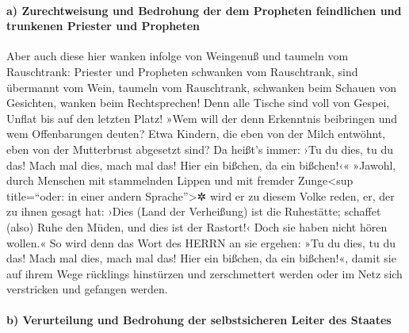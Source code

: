 \hypertarget{a-zurechtweisung-und-bedrohung-der-dem-propheten-feindlichen-und-trunkenen-priester-und-propheten}{%
\paragraph{a) Zurechtweisung und Bedrohung der dem Propheten feindlichen
und trunkenen Priester und
Propheten}\label{a-zurechtweisung-und-bedrohung-der-dem-propheten-feindlichen-und-trunkenen-priester-und-propheten}}

Aber auch diese hier wanken infolge von Weingenuß und
taumeln vom Rauschtrank: Priester und Propheten schwanken vom
Rauschtrank, sind übermannt vom Wein, taumeln vom Rauschtrank, schwanken
beim Schauen von Gesichten, wanken beim Rechtsprechen!
Denn alle Tische sind voll von Gespei, Unflat bis auf den
letzten Platz! »Wem will der denn Erkenntnis beibringen
und wem Offenbarungen deuten? Etwa Kindern, die eben von der Milch
entwöhnt, eben von der Mutterbrust abgesetzt sind? Da
heißt's immer: ›Tu du dies, tu du das! Mach mal dies, mach mal das! Hier
ein bißchen, da ein bißchen!‹« »Jawohl, durch Menschen
mit stammelnden Lippen und mit fremder Zunge\textless sup title=``oder:
in einer andern Sprache''\textgreater✲ wird er zu diesem Volke reden,
er, der zu ihnen gesagt hat: ›Dies (Land der Verheißung)
ist die Ruhestätte; schaffet (also) Ruhe den Müden, und dies ist der
Rastort!‹ Doch sie haben nicht hören wollen.« So wird
denn das Wort des HERRN an sie ergehen: »Tu du dies, tu du das! Mach mal
dies, mach mal das! Hier ein bißchen, da ein bißchen!«, damit sie auf
ihrem Wege rücklings hinstürzen und zerschmettert werden oder im Netz
sich verstricken und gefangen werden.

\hypertarget{b-verurteilung-und-bedrohung-der-selbstsicheren-leiter-des-staates}{%
\paragraph{b) Verurteilung und Bedrohung der selbstsicheren Leiter des
Staates}\label{b-verurteilung-und-bedrohung-der-selbstsicheren-leiter-des-staates}}

